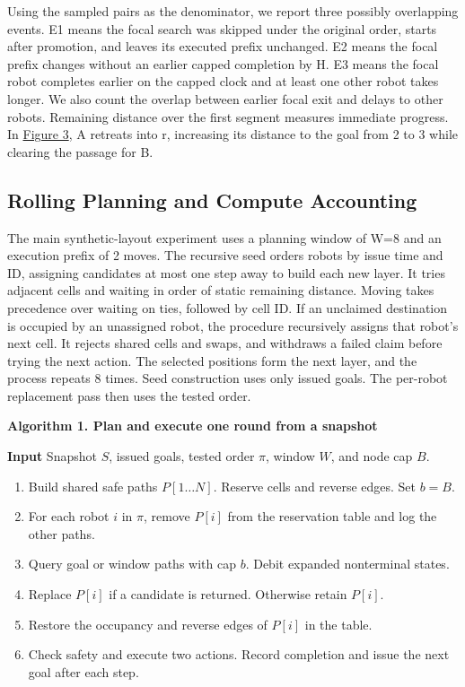 \documentclass{article}
\begin{document}
Using the sampled pairs as the denominator, we report three possibly overlapping events. E1 means the focal search was skipped under the original order, starts after promotion, and leaves its executed prefix unchanged. E2 means the focal prefix changes without an earlier capped completion by H. E3 means the focal robot completes earlier on the capped clock and at least one other robot takes longer. We also count the overlap between earlier focal exit and delays to other robots. Remaining distance over the first segment measures immediate progress. In \hyperlink{display:Figure3}{Figure 3}, A retreats into r, increasing its distance to the goal from 2 to 3 while clearing the passage for B.

\subsection{Rolling Planning and Compute Accounting}
The main synthetic-layout experiment uses a planning window of W=8 and an execution prefix of 2 moves. The recursive seed orders robots by issue time and ID, assigning candidates at most one step away to build each new layer. It tries adjacent cells and waiting in order of static remaining distance. Moving takes precedence over waiting on ties, followed by cell ID. If an unclaimed destination is occupied by an unassigned robot, the procedure recursively assigns that robot's next cell. It rejects shared cells and swaps, and withdraws a failed claim before trying the next action. The selected positions form the next layer, and the process repeats 8 times. Seed construction uses only issued goals. The per-robot replacement pass then uses the tested order.


\par\medskip\noindent\begin{minipage}{\columnwidth}
\small\textbf{Algorithm 1. Plan and execute one round from a snapshot}\par\smallskip
\textbf{Input} Snapshot $S$, issued goals, tested order $\pi$, window $W$, and node cap $B$.
\begin{enumerate}\setlength{\itemsep}{1pt}\setlength{\parsep}{0pt}\setlength{\topsep}{3pt}
\item Build shared safe paths $P[1\ldots N]$. Reserve cells and reverse edges. Set $b=B$.
\item For each robot $i$ in $\pi$, remove $P[i]$ from the reservation table and log the other paths.
\item Query goal or window paths with cap $b$. Debit expanded nonterminal states.
\item Replace $P[i]$ if a candidate is returned. Otherwise retain $P[i]$.
\item Restore the occupancy and reverse edges of $P[i]$ in the table.
\item Check safety and execute two actions. Record completion and issue the next goal after each step.
\end{enumerate}
\end{minipage}\par\medskip
\end{document}
